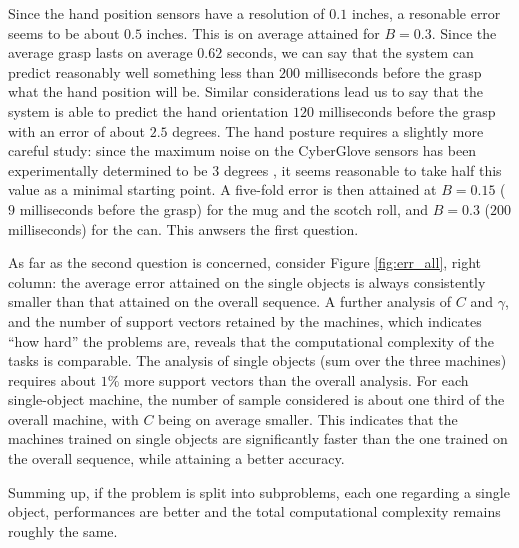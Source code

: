 Since the hand position sensors have a resolution of $0.1$ inches, a
resonable error seems to be about $0.5$ inches. This is on average
attained for $B=0.3$. Since the average grasp lasts on average $0.62$
seconds, we can say that the system can predict reasonably well
something less than $200$ milliseconds before the grasp what the hand
position will be. Similar considerations lead us to say that the
system is able to predict the hand orientation $120$ milliseconds
before the grasp with an error of about $2.5$ degrees. The hand
posture requires a slightly more careful study: since the maximum
noise on the CyberGlove sensors has been experimentally determined to
be $3$ degrees \cite{212431}, it seems reasonable to take half this
value as a minimal starting point. A five-fold error is then attained
at $B=0.15$ ($9$ milliseconds before the grasp) for the mug and the
scotch roll, and $B=0.3$ ($200$ milliseconds) for the can. This
anwsers the first question.

As far as the second question is concerned, consider Figure
\ref{fig:err_all}, right column: the average error attained on the
single objects is always consistently smaller than that attained on
the overall sequence. A further analysis of $C$ and $\gamma$, and the
number of support vectors retained by the machines, which indicates
``how hard'' the problems are, reveals that the computational
complexity of the tasks is comparable. The analysis of single objects
(sum over the three machines) requires about $1\%$ more support
vectors than the overall analysis. For each single-object machine, the
number of sample considered is about one third of the overall machine,
with $C$ being on average smaller. This indicates that the machines
trained on single objects are significantly faster than the one
trained on the overall sequence, while attaining a better accuracy.

Summing up, if the problem is split into subproblems, each one
regarding a single object, performances are better and the total
computational complexity remains roughly the same.
